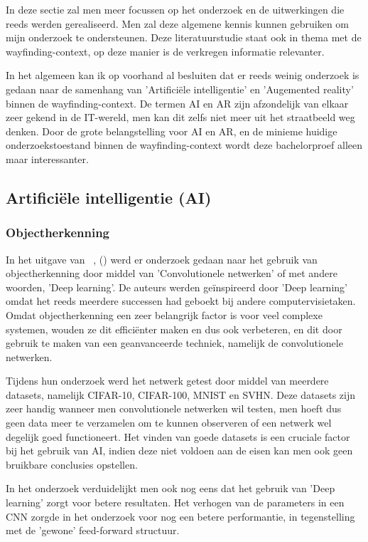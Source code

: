In deze sectie zal men meer focussen op het onderzoek en de uitwerkingen die reeds werden gerealiseerd. Men zal deze algemene kennis kunnen gebruiken om mijn onderzoek te ondersteunen. Deze literatuurstudie staat ook in thema met de wayfinding-context, op deze manier is de verkregen informatie relevanter.

In het algemeen kan ik op voorhand al besluiten dat er reeds weinig onderzoek is gedaan naar de samenhang van 'Artificiële intelligentie' en 'Augemented reality' binnen de wayfinding-context. De termen AI en AR zijn afzondelijk van elkaar zeer gekend in de IT-wereld, men kan dit zelfs niet meer uit het straatbeeld weg denken. Door de grote belangstelling voor AI en AR, en de minieme huidige onderzoekstoestand binnen de wayfinding-context wordt deze bachelorproef alleen maar interessanter.

\subsection{Artificiële intelligentie (AI)}

\subsubsection{Objectherkenning}
In het uitgave van ~\textcite{Liang2015}, () werd er onderzoek gedaan naar het gebruik van objectherkenning door middel van 'Convolutionele netwerken' of met andere woorden, 'Deep learning'. De auteurs werden geïnspireerd door 'Deep learning' omdat het reeds meerdere successen had geboekt bij andere computervisietaken. Omdat objectherkenning een zeer belangrijk factor is voor veel complexe systemen, wouden ze dit efficiënter maken en dus ook verbeteren, en dit door gebruik te maken van een geanvanceerde techniek, namelijk de convolutionele netwerken. 

Tijdens hun onderzoek werd het netwerk getest door middel van meerdere datasets, namelijk CIFAR-10, CIFAR-100, MNIST en SVHN. Deze datasets zijn zeer handig wanneer men convolutionele netwerken wil testen, men hoeft dus geen data meer te verzamelen om te kunnen observeren of een netwerk wel degelijk goed functioneert. Het vinden van goede datasets is een cruciale factor bij het gebruik van AI, indien deze niet voldoen aan de eisen kan men ook geen bruikbare conclusies opstellen.

In het onderzoek verduidelijkt men ook nog eens dat het gebruik van 'Deep learning' zorgt voor betere resultaten. Het verhogen van de parameters in een CNN zorgde in het onderzoek voor nog een betere performantie, in tegenstelling met de 'gewone' feed-forward structuur. 

